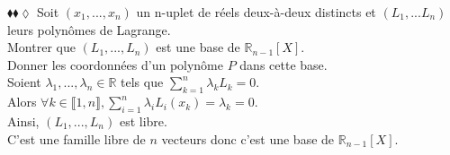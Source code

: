 \documentclass[11pt]{article}
\newcommand*{\R}{\mathbb{R}}
\begin{document}
\begin{exercise}{$\blacklozenge\blacklozenge\lozenge$}{}
    Soit $(x_1, ..., x_n)$ un n-uplet de réels deux-à-deux distincts et $(L_1,...L_n)$ leurs polynômes de Lagrange.\\
    Montrer que $(L_1, ..., L_n)$ est une base de $\R_{n-1}[X]$.\\
    Donner les coordonnées d'un polynôme $P$ dans cette base.
    \tcblower\\[0.2cm]
    Soient $\lambda_1, ..., \lambda_n \in \R$ tels que $\sum_{k=1}^n\lambda_kL_k = 0$.\\
    Alors $\forall k \in \llbracket 1, n \rrbracket, \sum_{i=1}^n\lambda_iL_i(x_k) = \lambda_k = 0$.\\
    Ainsi, $(L_1, ..., L_n)$ est libre.\\
    C'est une famille libre de $n$ vecteurs donc c'est une base de $\R_{n-1}[X]$.
\end{exercise}
\end{document}
